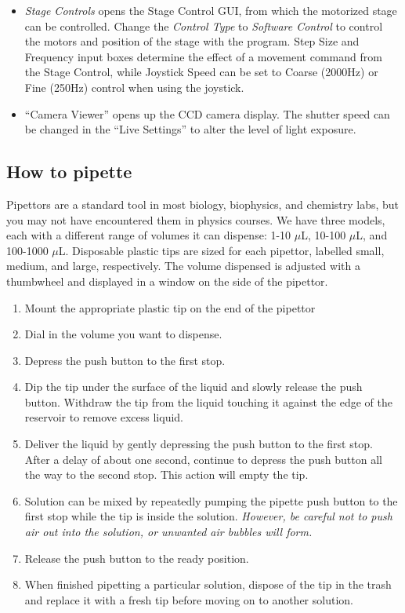 \documentclass{../lab}
\begin{document}
\begin{itemize}
    \item \emph{Stage Controls} opens the Stage Control GUI, from which the motorized stage can be controlled. Change the \emph{Control Type} to \emph{Software Control} to control the motors and position of the stage with the program. Step Size and Frequency input boxes determine the effect of a movement command from the Stage Control, while Joystick Speed can be set to Coarse (2000Hz) or Fine (250Hz) control when using the joystick.

    \item ``Camera Viewer'' opens up the CCD camera display. The shutter speed can be changed in the ``Live Settings'' to alter the level of light exposure.
\end{itemize}

\subsection{How to pipette}

Pipettors are a standard tool in most biology, biophysics, and chemistry labs, but you may not have encountered them in physics courses. We have three models, each with a different range of volumes it can dispense: 1-10 $\mu$L, 10-100 $\mu$L, and 100-1000 $\mu$L. Disposable plastic tips are sized for each pipettor, labelled small, medium, and large, respectively. The volume dispensed is adjusted with a thumbwheel and displayed in a window on the side of the pipettor.

\begin{enumerate}
    \item Mount the appropriate plastic tip on the end of the pipettor

    \item Dial in the volume you want to dispense.

    \item Depress the push button to the first stop.

    \item Dip the tip under the surface of the liquid and slowly release the push button. Withdraw the tip from the liquid touching it against the edge of the reservoir to remove excess liquid.

    \item Deliver the liquid by gently depressing the push button to the first stop. After a delay of about one second, continue to depress the push button all the way to the second stop. This action will empty the tip.

    \item Solution can be mixed by repeatedly pumping the pipette push button to the first stop while the tip is inside the solution. \emph{However, be careful not to push air out into the solution, or unwanted air bubbles will form.}

    \item Release the push button to the ready position.

    \item When finished pipetting a particular solution, dispose of the tip in the trash and replace it with a fresh tip before moving on to another solution.
\end{enumerate}
\end{document}
